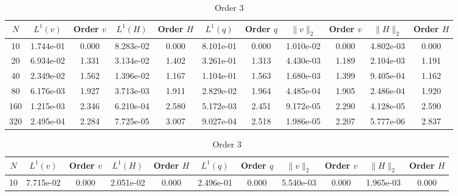 \documentclass[english]{article}
\theoremstyle{thmstyleone}
\theoremstyle{thmstyletwo}
\theoremstyle{thmstylethree}
\begin{document}
	


\begin{table}[ht]
	\centering
	\caption{Supercritical Smooth}
	\label{tab:supercritical}
	\begin{adjustbox}{width=1\textwidth}
	\small
		\begin{subtable}{1.\linewidth}
			\centering
			\caption{Order 2}
			\begin{tabular}{ccccccccccc}
				\toprule
				$N$ & $L^1(v)$ & Order $v$ & $L^1(H)$ & Order $H$ & $L^1(q)$ & Order $q$ & $\|v\|_2$ & Order $v$ & $\|H\|_2$ & Order $H$ \\
				\midrule
				10 & 1.744e-01 & 0.000 & 8.283e-02 & 0.000 & 8.101e-01 & 0.000 & 1.010e-02 & 0.000 & 4.802e-03 & 0.000 \\
				20 & 6.934e-02 & 1.331 & 3.134e-02 & 1.402 & 3.261e-01 & 1.313 & 4.430e-03 & 1.189 & 2.104e-03 & 1.191 \\
				40 & 2.349e-02 & 1.562 & 1.396e-02 & 1.167 & 1.104e-01 & 1.563 & 1.680e-03 & 1.399 & 9.405e-04 & 1.162 \\
				80 & 6.176e-03 & 1.927 & 3.713e-03 & 1.911 & 2.829e-02 & 1.964 & 4.485e-04 & 1.905 & 2.486e-04 & 1.920 \\
				160 & 1.215e-03 & 2.346 & 6.210e-04 & 2.580 & 5.172e-03 & 2.451 & 9.172e-05 & 2.290 & 4.128e-05 & 2.590 \\
				320 & 2.495e-04 & 2.284 & 7.725e-05 & 3.007 & 9.027e-04 & 2.518 & 1.986e-05 & 2.207 & 5.777e-06 & 2.837 \\
				\bottomrule
			\end{tabular}
		\end{subtable}
	\end{adjustbox}
	\begin{adjustbox}{width=1\textwidth}
	\small
		\begin{subtable}{1.\linewidth}
			\centering
			\caption{Order 3}
			\begin{tabular}{ccccccccccc}
				\toprule
				$N$ & $L^1(v)$ & Order $v$ & $L^1(H)$ & Order $H$ & $L^1(q)$ & Order $q$ & $\|v\|_2$ & Order $v$ & $\|H\|_2$ & Order $H$ \\
				\midrule
				10 & 7.715e-02 & 0.000 & 2.051e-02 & 0.000 & 2.496e-01 & 0.000 & 5.540e-03 & 0.000 & 1.965e-03 & 0.000 \\

\end{tabular}
\end{subtable}
\end{adjustbox}
\end{table}
\end{document}

